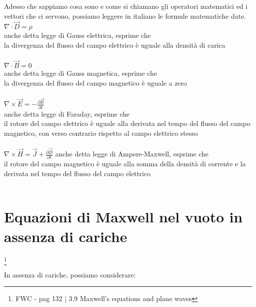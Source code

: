 \begin{tcolorbox}
    Adesso che sappiamo cosa sono e come si chiamano gli operatori matematici ed i vettori che ci servono, 
    possiamo leggere in italiano le formule matematiche date. \\ 
    
    $\nabla \cdot \vec{D} = \rho$ \\ 
    anche detta legge di Gauss elettrica, esprime che \\ 
    la divergenza del flusso del campo elettrico è uguale alla densità di carica \\ \\

    $\nabla \cdot \vec{B} = 0$ \\ 
    anche detta legge di Gauss magnetica, esprime che \\ 
    la divergenza del flusso del campo magnetico è uguale a zero \\ \\ 

    $\nabla \times \vec{E} = -\frac{\partial \vec{B}}{\partial t}$ \\
    anche detta legge di Faraday, esprime che \\ 
    il rotore del campo elettrico è uguale alla derivata nel tempo del flusso del campo magnetico, 
    con verso contrario rispetto al campo elettrico stesso \\ \\ 
    
    $\nabla \times \vec{H} = \vec{J} + \frac{\partial \vec{D}}{\partial t}$ \newline
    anche detta legge di Ampere-Maxwell, esprime che \\ 
    il rotore del campo magnetico è uguale alla somma della densità di corrente 
    e la derivata nel tempo del flusso del campo elettrico \\ \\ 



\end{tcolorbox}


\newpage 

\section{Equazioni di Maxwell nel vuoto in assenza di cariche} 
\footnote{FWC - pag 132 | 3.9 Maxwell's equations and plane waves}

In assenza di cariche, possiamo considerare: \\


